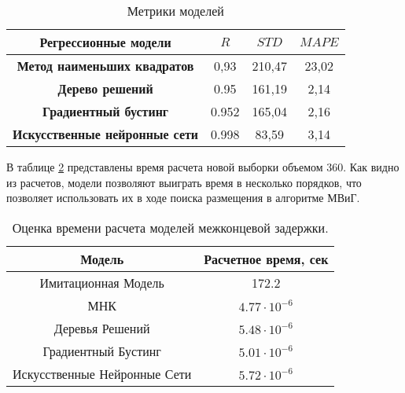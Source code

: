 \begin{table}[b]\label{tab:total_reg_metrics}
    \caption{ Метрики моделей}
    \begin{tabular}{|c|ccc|}
        \toprule
        Регрессионные модели    &$R$    & $STD$    &   $MAPE$\\
    
        \midrule
        \textbf{Метод наименьших квадратов} & 0,93   &   210,47  &   23,02 \\
        \textbf{Дерево решений} & 0.95   &   161,19  &   2,14 \\
        \textbf{Градиентный бустинг} & 0.952   &   165,04  &   2,16  \\
        \textbf{Искусственные нейронные сети} & 0.998   &   83,59  &   3,14  \\
        \bottomrule
    \end{tabular}
\end{table}



В таблице \cref{tab:calculation_times} представлены время расчета новой выборки объемом 360. Как видно из расчетов, модели позволяют выиграть время в несколько порядков, что позволяет использовать их в ходе поиска размещения в алгоритме МВиГ.

\begin{table}
    \caption{\label{tab:calculation_times} Оценка времени расчета моделей межконцевой задержки.}
    \begin{tabular}{|cc|}
        \toprule
        \textbf{Модель} & \textbf{Расчетное время, сек} \\
        \toprule
        Имитационная Модель & 172.2 \\
        МНК & $4.77\cdot 10^{-6}$  \\
        Деревья Решений & $5.48\cdot 10^{-6}$ \\
        Градиентный Бустинг & $5.01\cdot 10^{-6}$  \\
        Искусственные Нейронные Сети & $5.72\cdot 10^{-6}$ \\


        \bottomrule
    \end{tabular}
\end{table}


    
